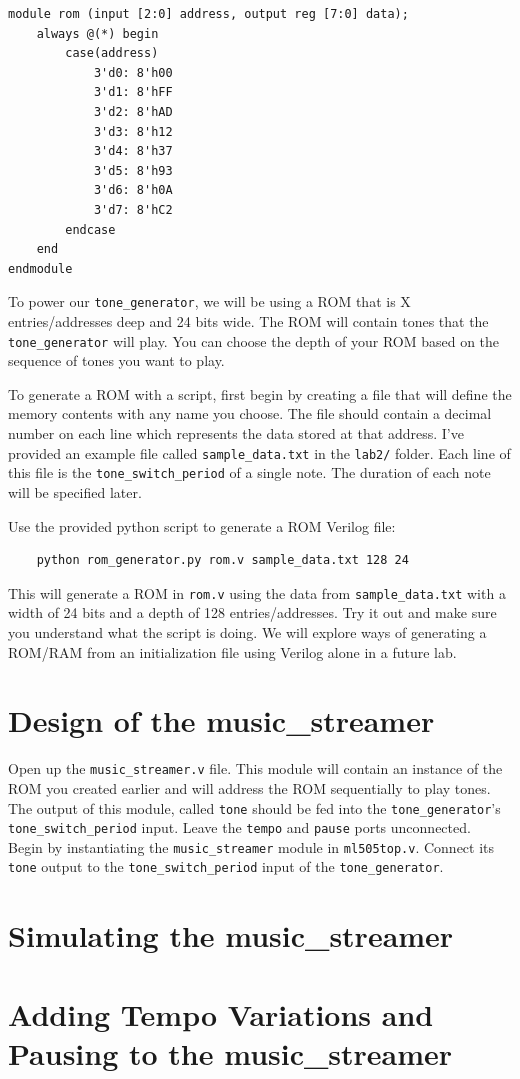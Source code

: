 \documentclass[11pt]{article}
\begin{document}
\begin{verbatim}
module rom (input [2:0] address, output reg [7:0] data);
	always @(*) begin
		case(address)
			3'd0: 8'h00
			3'd1: 8'hFF
			3'd2: 8'hAD
			3'd3: 8'h12
			3'd4: 8'h37
			3'd5: 8'h93
			3'd6: 8'h0A
			3'd7: 8'hC2
		endcase
	end
endmodule
\end{verbatim}

To power our \verb|tone_generator|, we will be using a ROM that is X entries/addresses deep and 24 bits wide. The ROM will contain tones that the \verb|tone_generator| will play. You can choose the depth of your ROM based on the sequence of tones you want to play.

To generate a ROM with a script, first begin by creating a file that will define the memory contents with any name you choose. The file should contain a decimal number on each line which represents the data stored at that address. I've provided an example file called \verb|sample_data.txt| in the \verb|lab2/| folder. Each line of this file is the \verb|tone_switch_period| of a single note. The duration of each note will be specified later.

Use the provided python script to generate a ROM Verilog file:

\begin{verbatim}
	python rom_generator.py rom.v sample_data.txt 128 24
\end{verbatim}

This will generate a ROM in \verb|rom.v| using the data from \verb|sample_data.txt| with a width of 24 bits and a depth of 128 entries/addresses. Try it out and make sure you understand what the script is doing. We will explore ways of generating a ROM/RAM from an initialization file using Verilog alone in a future lab.

\section{Design of the music\_streamer}
Open up the \verb|music_streamer.v| file. This module will contain an instance of the ROM you created earlier and will address the ROM sequentially to play tones. The output of this module, called \verb|tone| should be fed into the \verb|tone_generator|'s \verb|tone_switch_period| input. Leave the \verb|tempo| and \verb|pause| ports unconnected.\\

Begin by instantiating the \verb|music_streamer| module in \verb|ml505top.v|. Connect its \verb|tone| output to the \verb|tone_switch_period| input of the \verb|tone_generator|.

\section{Simulating the music\_streamer}

\section{Adding Tempo Variations and Pausing to the music\_streamer}
\end{document}
